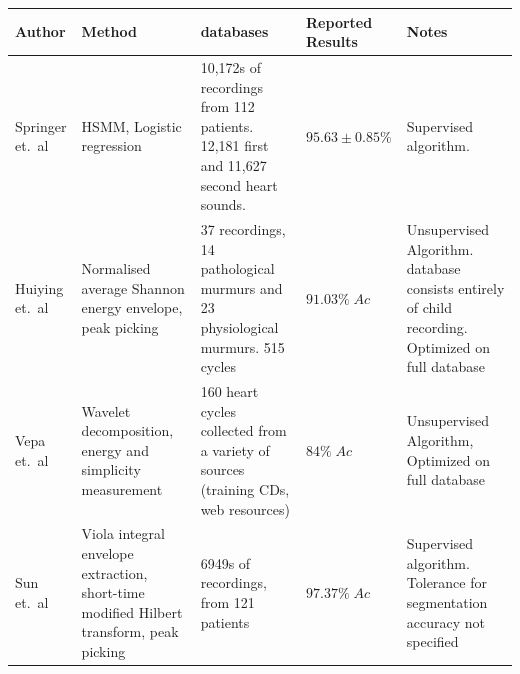 \documentclass[titlepage, 12pt]{scrartcl} \usepackage{enumitem}
\newcommand{\dtoprule}{\specialrule{1pt}{0pt}{1.4pt}%
            \specialrule{1pt}{0pt}{\belowrulesep}%
            }
\begin{document}
\begin{landscape}
\begin{table}[htbp]
 \label{SegmentationTable}
\scriptsize
{}
\doublespacing
\begin{tabulary}{\linewidth}{LLLLL}
\dtoprule
Author                 & Method                                                                                         & databases                                                                                       & \mbox{Reported} Results         & Notes                                                                                            \\ \bottomrule
Springer et.\ al \citeyearpar{Springer2016} & HSMM, Logistic regression                                                                       & 10,172s of recordings from 112 patients. 12,181 first and 11,627 second heart sounds. & $95.63\pm0.85\%$                             & Supervised algorithm.                                                                                                                                                            \\
Huiying et.\ al \citeyearpar{Liang1997b} & Normalised average Shannon energy envelope, peak picking                                        & 37 recordings, 14 pathological murmurs and 23 physiological murmurs. 515 cycles       & $91.03\%\;Ac$                                          & Unsupervised Algorithm.  database consists entirely of child recording. Optimized on full database                                                                                 \\
Vepa et.\ al \citeyearpar{Vepa2008}     & Wavelet decomposition, energy and simplicity measurement                                       & 160 heart cycles collected from a variety of sources (training CDs, web resources)    & $84\%\;Ac$                                             & Unsupervised Algorithm, Optimized on full database                                                                                                                                \\
Sun et.\ al \citeyearpar{Sun2014}             & Viola integral envelope extraction, short-time modified Hilbert transform, peak picking        & 6949s of recordings, from 121 patients                                                & $97.37\%\;Ac$                                          & Supervised algorithm. Tolerance for segmentation accuracy not specified                                                                                                          \\

\end{tabulary}
\end{table}
\end{landscape}
\end{document}
